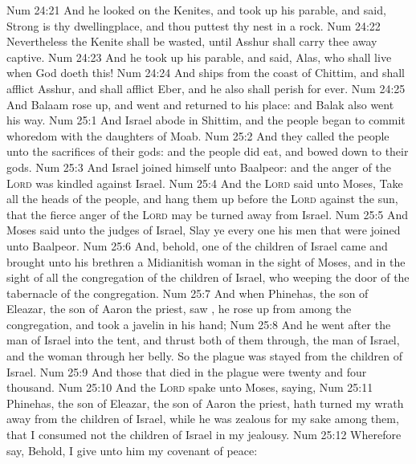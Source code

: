\vs Num 24:21 And he looked on the Kenites, and took up his parable, and said, Strong is thy dwellingplace, and thou puttest thy nest in a rock.
\vs Num 24:22 Nevertheless the Kenite shall be wasted, until Asshur shall carry thee away captive.
\vs Num 24:23 And he took up his parable, and said, Alas, who shall live when God doeth this!
\vs Num 24:24 And ships  from the coast of Chittim, and shall afflict Asshur, and shall afflict Eber, and he also shall perish for ever.
\vs Num 24:25 And Balaam rose up, and went and returned to his place: and Balak also went his way.
\vs Num 25:1 And Israel abode in Shittim, and the people began to commit whoredom with the daughters of Moab.
\vs Num 25:2 And they called the people unto the sacrifices of their gods: and the people did eat, and bowed down to their gods.
\vs Num 25:3 And Israel joined himself unto Baalpeor: and the anger of the \textsc{Lord} was kindled against Israel.
\vs Num 25:4 And the \textsc{Lord} said unto Moses, Take all the heads of the people, and hang them up before the \textsc{Lord} against the sun, that the fierce anger of the \textsc{Lord} may be turned away from Israel.
\vs Num 25:5 And Moses said unto the judges of Israel, Slay ye every one his men that were joined unto Baalpeor.
\vs Num 25:6 And, behold, one of the children of Israel came and brought unto his brethren a Midianitish woman in the sight of Moses, and in the sight of all the congregation of the children of Israel, who  weeping  the door of the tabernacle of the congregation.
\vs Num 25:7 And when Phinehas, the son of Eleazar, the son of Aaron the priest, saw , he rose up from among the congregation, and took a javelin in his hand;
\vs Num 25:8 And he went after the man of Israel into the tent, and thrust both of them through, the man of Israel, and the woman through her belly. So the plague was stayed from the children of Israel.
\vs Num 25:9 And those that died in the plague were twenty and four thousand.
\vs Num 25:10 And the \textsc{Lord} spake unto Moses, saying,
\vs Num 25:11 Phinehas, the son of Eleazar, the son of Aaron the priest, hath turned my wrath away from the children of Israel, while he was zealous for my sake among them, that I consumed not the children of Israel in my jealousy.
\vs Num 25:12 Wherefore say, Behold, I give unto him my covenant of peace:
